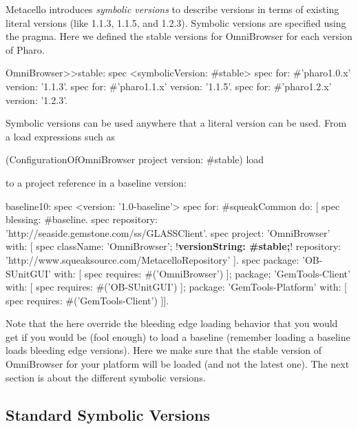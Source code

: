 \documentclass[a4paper,10pt,twoside]{book}
\begin{document}
Metacello introduces \emph{symbolic versions} to describe versions in terms of existing literal versions (like 1.1.3, 1.1.5, and 1.2.3). Symbolic versions are specified using the  pragma. Here we defined the stable versions for OmniBrowser for each version of Pharo.

\begin{code}{}
OmniBrowser>>stable: spec
     <symbolicVersion: #stable>
     spec for: #'pharo1.0.x' version: '1.1.3'.
     spec for: #'pharo1.1.x' version: '1.1.5'.
     spec for: #'pharo1.2.x' version: '1.2.3'.
\end{code}

Symbolic versions can be used anywhere that a literal version can be used. From a load expressions such as 

\begin{code}{}
(ConfigurationOfOmniBrowser project version: #stable) load
\end{code}

to a project reference in a baseline version:

\begin{code}{}
baseline10: spec
     <version: '1.0-baseline'>
     spec for: #squeakCommon do: [
          spec blessing: #baseline.
          spec repository: 'http://seaside.gemstone.com/ss/GLASSClient'.
     spec
          project: 'OmniBrowser' with: [
          spec
               className: 'OmniBrowser';
               !\textbf{versionString: \#stable;}!
               repository: 'http://www.squeaksource.com/MetacelloRepository' ].
     spec
         package: 'OB-SUnitGUI' with: [
               spec requires: #('OmniBrowser') ];
         package: 'GemTools-Client' with: [
               spec requires: #('OB-SUnitGUI') ];
         package: 'GemTools-Platform' with: [
               spec requires: #('GemTools-Client') ]].
\end{code}

Note that the  here override the bleeding edge loading behavior that you would get if you would be (fool enough) to load a baseline (remember loading a baseline loads bleeding edge versions). Here we make sure that the stable version of OmniBrowser for your platform will be loaded (and not the latest one). The next section is about the different symbolic versions.
    
   
    


\subsection{Standard Symbolic Versions}
\end{document}

